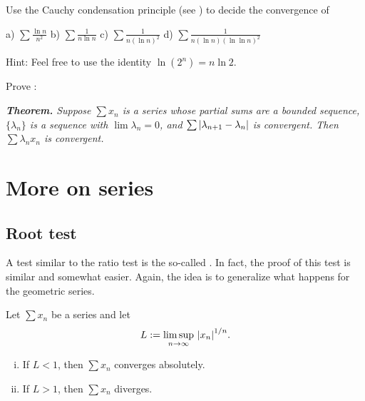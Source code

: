 \begin{exercise}
Use the Cauchy condensation principle
(see )
to decide the convergence of

\medskip

\noindent
a) $\displaystyle \sum \frac{\ln n}{n^2}$
\qquad
b) $\displaystyle \sum \frac{1}{n \ln n}$
\qquad
c) $\displaystyle \sum \frac{1}{n {(\ln n)}^2}$
\qquad
d) $\displaystyle \sum \frac{1}{n (\ln n ){(\ln \ln n)}^2}$

\medskip

\noindent
Hint: Feel free to use the identity $\ln (2^n) = n \ln 2$.
\end{exercise}

\begin{exercise}[Challenging]
Prove \emph{}:

\medskip

\noindent
\emph{\textbf{Theorem.} Suppose $\sum x_n$ is a series whose partial sums
are a bounded sequence, $\{ \lambda_n \}$ is a sequence with $\lim \lambda_n = 0$, and
$\sum \left\lvert { \lambda_{n+1} - \lambda_n } \right\rvert$ is convergent.
Then $\sum \lambda_n x_n$ is convergent.}
\end{exercise}




\sectionnewpage
\section{More on series}
\label{sec:moreonseries}


\subsection{Root test}

A test similar to the ratio test is the so-called
\emph{}.  In fact, the 
proof of this test is similar and somewhat easier.
Again, the idea is to generalize what happens for the geometric series.

\begin{prop}
Let $\sum x_n$ be a series and let
\begin{equation*}
L := \limsup_{n\to\infty} \, {\lvert {x_n} \rvert}^{1/n} .
\end{equation*}
\begin{enumerate}[(i)]
\item If $L < 1$, then $\sum x_n$ converges absolutely.
\item If $L > 1$, then $\sum x_n$ diverges.
\end{enumerate}
\end{prop}

